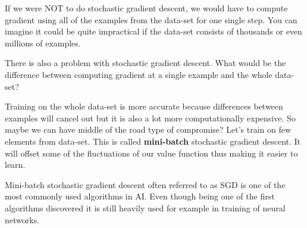 If we were NOT to do stochastic gradient descent, we would have to compute gradient using all of the examples from the data-set for one single step. You can imagine it could be quite impractical if the data-set consists of thousands or even millions of examples.

There is also a problem with stochastic gradient descent. What would be the difference between computing gradient at a single example and the whole data-set?


Training on the whole data-set is more accurate because differences between examples will cancel out but it is also a lot more computationally expensive. So maybe we can have middle of the road type of compromise? Let’s train on few elements from data-set. This is called \textbf{mini-batch} stochastic gradient descent. It will offset some of the fluctuations of our value function thus making it easier to learn. 

Mini-batch stochastic gradient descent often referred to as SGD is one of the most commonly used algorithms in AI. Even though being one of the first algorithms discovered it is still heavily used for example in training of neural networks.

